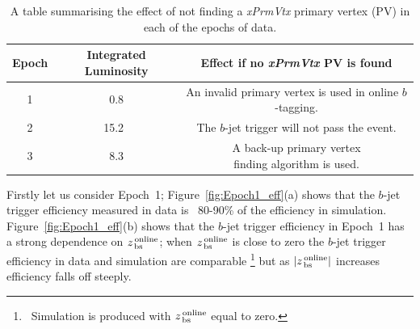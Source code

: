 \begin{table}[!htb]
   \vspace{-0.5em}
  \begin{center}
  \begin{tabular}{ | c || c | c |}
    \hline			
    \textbf{Epoch}  & \textbf{Integrated Luminosity}    & \textbf{Effect if no \textit{xPrmVtx} PV is found} \\ \hline
    \parbox[c]{0.2cm}{\vspace{0.5em}1}      &  \parbox[c]{1cm}{\vspace{0.5em}~0.8~\ifb{}}     & \parbox[t]{4.5cm} {An invalid primary vertex \\is used in online $b$-tagging. \vspace{0.2em}} \\
    \hline                                                     
    \parbox[c]{0.2cm}{\vspace{0.5em}2}      &  \parbox[c]{1.2cm}{\vspace{0.5em}15.2~\ifb{}}     & \parbox[t]{4.5cm}{The $b$-jet trigger will not \\pass the event. \vspace{0.2em} }\\
    \hline                                                
    \parbox[c]{0.2cm}{\vspace{0.5em}3}      &  \parbox[c]{1cm}{\vspace{0.5em}~8.3~\ifb{}}     & \parbox[t]{4.5cm} {A back-up primary vertex \\ finding algorithm is used.\vspace{0.2em}} \\
    \hline
  \end{tabular}
  \end{center}
  \vspace{-0.5em}
  \caption{A table summarising the effect of not finding a \textit{xPrmVtx} primary vertex (PV) in each of the epochs of data.}
  \label{tab:trig-epochs}
  \vspace{-0.5em}
\end{table}

\newpage

Firstly let us consider Epoch~1;
Figure~\ref{fig:Epoch1_eff}(a) shows that the $b$-jet trigger efficiency measured in data is ~80-90\% of the efficiency in simulation.
Figure~\ref{fig:Epoch1_eff}(b) shows that the $b$-jet trigger efficiency in Epoch~1 has a strong dependence on $z_{\,\text{bs}}^{\text{\,online}}$;
when $z_{\,\text{bs}}^{\text{\,online}}$ is close to zero the $b$-jet trigger efficiency in data and simulation are comparable
\footnote{\ Simulation is produced with $z_{\,\text{bs}}^{\text{\,online}}$ equal to zero.}
but as $|z_{\,\text{bs}}^{\text{\,online}}|$ increases efficiency falls off steeply.

